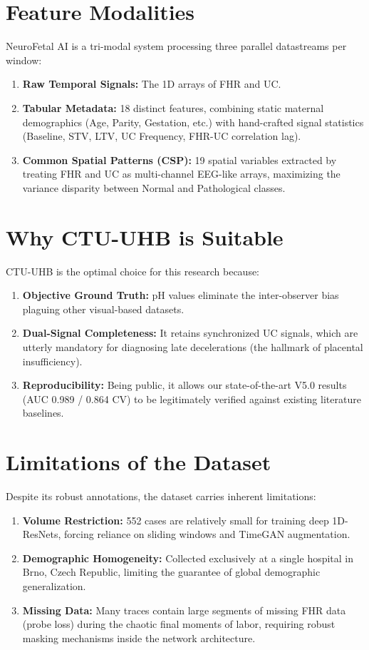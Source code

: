 \documentclass[12pt,a4paper]{report}
\begin{document}
\section{Feature Modalities}
NeuroFetal AI is a tri-modal system processing three parallel datastreams per window:
\begin{enumerate}
    \item \textbf{Raw Temporal Signals:} The 1D arrays of FHR and UC.
    \item \textbf{Tabular Metadata:} 18 distinct features, combining static maternal demographics (Age, Parity, Gestation, etc.) with hand-crafted signal statistics (Baseline, STV, LTV, UC Frequency, FHR-UC correlation lag).
    \item \textbf{Common Spatial Patterns (CSP):} 19 spatial variables extracted by treating FHR and UC as multi-channel EEG-like arrays, maximizing the variance disparity between Normal and Pathological classes.
\end{enumerate}

\section{Why CTU-UHB is Suitable}
CTU-UHB is the optimal choice for this research because:
\begin{enumerate}
    \item \textbf{Objective Ground Truth:} pH values eliminate the inter-observer bias plaguing other visual-based datasets.
    \item \textbf{Dual-Signal Completeness:} It retains synchronized UC signals, which are utterly mandatory for diagnosing late decelerations (the hallmark of placental insufficiency).
    \item \textbf{Reproducibility:} Being public, it allows our state-of-the-art V5.0 results (AUC 0.989 / 0.864 CV) to be legitimately verified against existing literature baselines.
\end{enumerate}

\section{Limitations of the Dataset}
Despite its robust annotations, the dataset carries inherent limitations:
\begin{enumerate}
    \item \textbf{Volume Restriction:} 552 cases are relatively small for training deep 1D-ResNets, forcing reliance on sliding windows and TimeGAN augmentation.
    \item \textbf{Demographic Homogeneity:} Collected exclusively at a single hospital in Brno, Czech Republic, limiting the guarantee of global demographic generalization.
    \item \textbf{Missing Data:} Many traces contain large segments of missing FHR data (probe loss) during the chaotic final moments of labor, requiring robust masking mechanisms inside the network architecture.
\end{enumerate}
\end{document}
